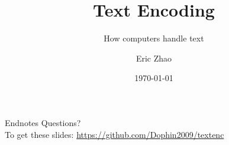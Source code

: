 \documentclass[xcolor={dvipsnames},xtable]{beamer}
\title{Text Encoding}
\subtitle{How computers handle text}
\date{\today}
\author{Eric Zhao}
\begin{document}

\newcommand{\sectiontitle}{}
\newcommand{\currenttitle}{}

\maketitle

\newcommand{\subdir}{sections}
\newcommand{\codedir}{listings}





\renewcommand{\sectiontitle}{Endnotes}
\begin{frame}[fragile]{\sectiontitle}
%
%
  Questions? \\[2em]

  To get these slides: \url{https://github.com/Dophin2009/textenc}
\end{frame}
\end{document}

